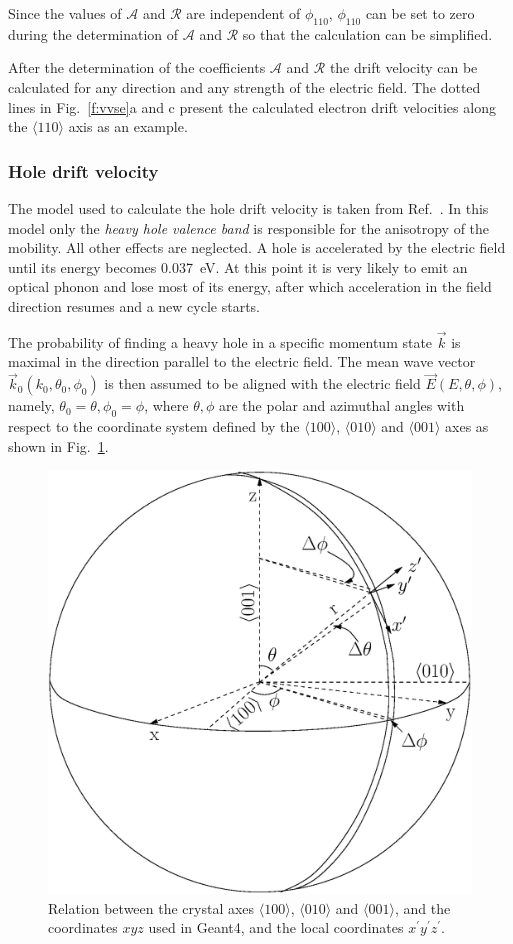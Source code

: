 \documentclass[epj]{svjour}
\begin{document}
Since the values of $\mathcal{A}$ and $\mathcal{R}$ are independent of
$\phi_{110}$, $\phi_{110}$ can be set to zero during the determination
of $\mathcal{A}$ and $\mathcal{R}$ so that the calculation can be
simplified.

After the determination of the coefficients $\mathcal{A}$ and
$\mathcal{R}$ the drift velocity can be calculated for any direction
and any strength of the electric field. The dotted lines in
Fig.~\ref{f:vvse}a and c present the calculated electron drift
velocities along the $\langle 110 \rangle$ axis as an example.
 
\subsubsection{Hole drift velocity} 
\label{s:hole} 
The model used to calculate the hole drift velocity is taken from
Ref.~\cite{bart}. In this model only the \emph{heavy hole valence
band} is responsible for the anisotropy of the mobility. All other
effects are neglected. A hole is accelerated by the electric field
until its energy becomes 0.037~eV. At this point it is very likely to
emit an optical phonon and lose most of its energy, after which
acceleration in the field direction resumes and a new cycle starts.
 
The probability of finding a heavy hole in a specific momentum state
$\vec{k}$ is maximal in the direction parallel to the electric
field. The mean wave vector $\vec{k}_{0}(k_{0}, \theta_{0},
\phi_{0})$ is then assumed to be aligned with the electric field
$\vec{E}(E, \theta, \phi)$, namely, $\theta_{0} = \theta,
\phi_{0} = \phi$, where $\theta, \phi$ are the polar and azimuthal
angles with respect to the coordinate system defined by the $\langle
100 \rangle$, $\langle 010 \rangle$ and $\langle 001 \rangle$ axes as
shown in Fig.~\ref{f:vsphere}.
 
\begin{figure}[htpb]
\centering
\includegraphics[width=0.8\linewidth]{vsphere}   
\caption{Relation between the crystal axes $\langle100\rangle$,
$\langle010\rangle$ and $\langle001\rangle$, and the coordinates $xyz$
used in Geant4, and the local coordinates
$x^{\prime}y^{\prime}z^{\prime}$.}
\label{f:vsphere} 
\end{figure} 
 
\end{document}
